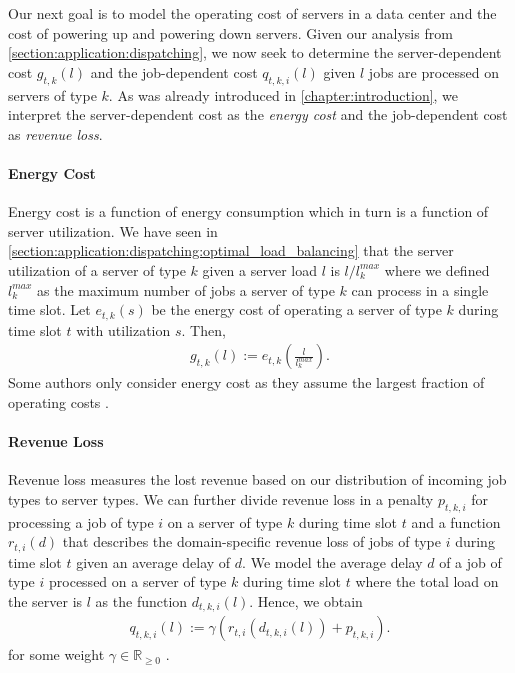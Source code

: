 Our next goal is to model the operating cost of servers in a data center and the cost of powering up and powering down servers. Given our analysis from \autoref{section:application:dispatching}, we now seek to determine the server-dependent cost $g_{t,k}(l)$ and the job-dependent cost $q_{t,k,i}(l)$ given $l$ jobs are processed on servers of type $k$. As was already introduced in \autoref{chapter:introduction}, we interpret the server-dependent cost as the \textit{energy cost} and the job-dependent cost as \textit{revenue loss}.

\paragraph{Energy Cost} Energy cost is a function of energy consumption which in turn is a function of server utilization. We have seen in \autoref{section:application:dispatching:optimal_load_balancing} that the server utilization of a server of type $k$ given a server load $l$ is $l / l_k^{max}$ where we defined $l_k^{max}$ as the maximum number of jobs a server of type $k$ can process in a single time slot. Let $e_{t,k}(s)$ be the energy cost of operating a server of type $k$ during time slot $t$ with utilization $s$. Then, \begin{align*}
    g_{t,k}(l) := e_{t,k}\left(\frac{l}{l_k^{max}}\right).
\end{align*} Some authors only consider energy cost as they assume the largest fraction of operating costs \cite{Bansal2015}.

\paragraph{Revenue Loss} Revenue loss measures the lost revenue based on our distribution of incoming job types to server types. We can further divide revenue loss in a penalty $p_{t,k,i}$ for processing a job of type $i$ on a server of type $k$ during time slot $t$ and a function $r_{t,i}(d)$ that describes the domain-specific revenue loss of jobs of type $i$ during time slot $t$ given an average delay of $d$. We model the average delay $d$ of a job of type $i$ processed on a server of type $k$ during time slot $t$ where the total load on the server is $l$ as the function $d_{t,k,i}(l)$. Hence, we obtain \begin{align*}
    q_{t,k,i}(l) := \gamma(r_{t,i}(d_{t,k,i}(l)) + p_{t,k,i}).
\end{align*} for some weight $\gamma \in \mathbb{R}_{\geq 0}$ \cite{Lin2011}.


